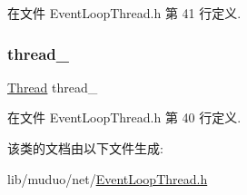 在文件 Event\+Loop\+Thread.\+h 第 41 行定义.

\mbox{\label{classmuduo_1_1net_1_1EventLoopThread_ad920b8087250a686bfa5a9805170974a}} 
\subsubsection{\texorpdfstring{thread\+\_\+}{thread\_}}
{\footnotesize\ttfamily \hyperlink{classmuduo_1_1Thread}{Thread} thread\+\_\+\hspace{0.3cm}{\ttfamily [private]}}



在文件 Event\+Loop\+Thread.\+h 第 40 行定义.



该类的文档由以下文件生成\+:\begin{DoxyCompactItemize}
\item 
lib/muduo/net/\hyperlink{muduo_2net_2EventLoopThread_8h}{Event\+Loop\+Thread.\+h}\end{DoxyCompactItemize}
